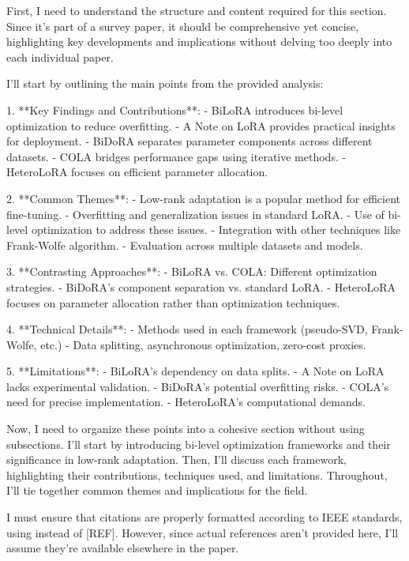 \documentclass[conference]{IEEEtran}
\begin{document}
First, I need to understand the structure and content required for this section. Since it's part of a survey paper, it should be comprehensive yet concise, highlighting key developments and implications without delving too deeply into each individual paper.

I'll start by outlining the main points from the provided analysis:

1. **Key Findings and Contributions**:
   - BiLoRA introduces bi-level optimization to reduce overfitting.
   - A Note on LoRA provides practical insights for deployment.
   - BiDoRA separates parameter components across different datasets.
   - COLA bridges performance gaps using iterative methods.
   - HeteroLoRA focuses on efficient parameter allocation.

2. **Common Themes**:
   - Low-rank adaptation is a popular method for efficient fine-tuning.
   - Overfitting and generalization issues in standard LoRA.
   - Use of bi-level optimization to address these issues.
   - Integration with other techniques like Frank-Wolfe algorithm.
   - Evaluation across multiple datasets and models.

3. **Contrasting Approaches**:
   - BiLoRA vs. COLA: Different optimization strategies.
   - BiDoRA's component separation vs. standard LoRA.
   - HeteroLoRA focuses on parameter allocation rather than optimization techniques.

4. **Technical Details**:
   - Methods used in each framework (pseudo-SVD, Frank-Wolfe, etc.)
   - Data splitting, asynchronous optimization, zero-cost proxies.

5. **Limitations**:
   - BiLoRA's dependency on data splits.
   - A Note on LoRA lacks experimental validation.
   - BiDoRA's potential overfitting risks.
   - COLA's need for precise implementation.
   - HeteroLoRA's computational demands.

Now, I need to organize these points into a cohesive section without using subsections. I'll start by introducing bi-level optimization frameworks and their significance in low-rank adaptation. Then, I'll discuss each framework, highlighting their contributions, techniques used, and limitations. Throughout, I'll tie together common themes and implications for the field.

I must ensure that citations are properly formatted according to IEEE standards, using \cite{bX} instead of [REF]. However, since actual references aren't provided here, I'll assume they're available elsewhere in the paper.
\end{document}
